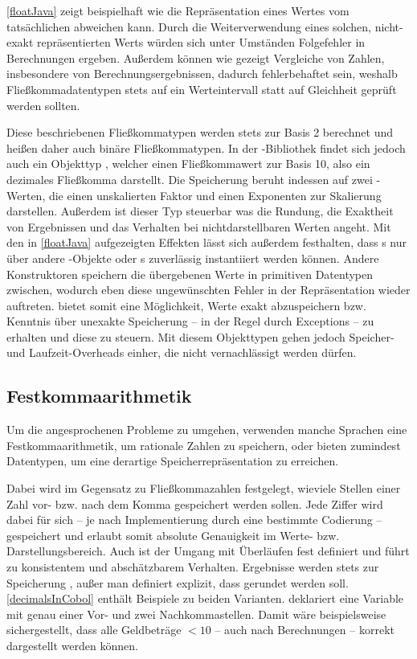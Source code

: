 \autoref{floatJava} zeigt beispielhaft wie die Repräsentation eines Wertes vom tatsächlichen abweichen kann. Durch die Weiterverwendung eines solchen, nicht-exakt repräsentierten Werts würden sich unter Umständen Folgefehler in Berechnungen ergeben. Außerdem können wie gezeigt Vergleiche von Zahlen, insbesondere von Berechnungsergebnissen, dadurch fehlerbehaftet sein, weshalb Fließkommadatentypen stets auf ein Werteintervall statt auf Gleichheit geprüft werden sollten.

Diese beschriebenen Fließkommatypen werden stets zur Basis 2 berechnet und heißen daher auch binäre Fließkommatypen. In der -Bibliothek findet sich jedoch auch ein Objekttyp , welcher einen Fließkommawert zur Basis 10, also ein dezimales Fließkomma darstellt. Die Speicherung beruht in­des­sen auf zwei -Werten, die einen unskalierten Faktor und einen Exponenten zur Skalierung darstellen. Außerdem ist dieser Typ steuerbar was die Rundung, die Exaktheit von Ergebnissen und das Verhalten bei nichtdarstellbaren Werten angeht. Mit den in \autoref{floatJava} aufgezeigten Effekten lässt sich außerdem festhalten, dass s nur über andere -Objekte oder s zuverlässig instantiiert werden können. Andere Konstruktoren speichern die übergebenen Werte in primitiven Datentypen zwischen, wodurch eben diese ungewünschten Fehler in der Repräsentation wieder auftreten.  bietet somit eine Möglichkeit, Werte exakt abzuspeichern bzw. Kenntnis über unexakte Speicherung -- in der Regel durch Exceptions -- zu erhalten und diese zu steuern. Mit diesem Objekttypen gehen jedoch Speicher- und Laufzeit-Overheads einher, die nicht vernachlässigt werden dürfen.

\subsection*{Festkommaarithmetik}
Um die angesprochenen Probleme zu umgehen, verwenden manche Sprachen eine Festkommaarithmetik, um rationale Zahlen zu speichern, oder bieten zumindest Datentypen, um eine derartige Speicherrepräsentation zu erreichen. 

Dabei wird im Gegensatz zu Fließkommazahlen festgelegt, wieviele Stellen einer Zahl vor- bzw. nach dem Komma gespeichert werden sollen. Jede Ziffer wird dabei für sich -- je nach Implementierung durch eine bestimmte Codierung -- gespeichert und erlaubt somit absolute Genauigkeit im Werte- bzw. Darstellungsbereich. Auch ist der Umgang mit Überläufen fest definiert und führt zu konsistentem und abschätzbarem Verhalten. Ergebnisse werden stets zur Speicherung , außer man definiert explizit, dass gerundet werden soll. \autoref{decimalsInCobol} enthält Beispiele zu beiden Varianten.  deklariert eine Variable mit genau einer Vor- und zwei Nachkommastellen. Damit wäre beispielsweise sichergestellt, dass alle Geldbeträge $< 10$ -- auch nach Berechnungen -- korrekt dargestellt werden können.


